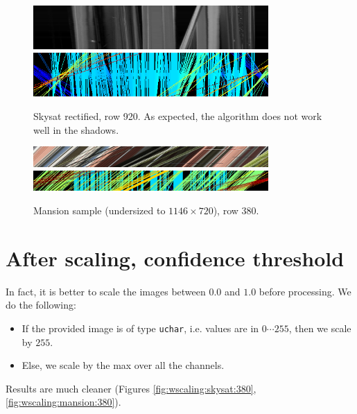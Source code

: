 \documentclass{article}
\def\epiWidth{0.8}
\theoremstyle{definition}
\begin{document}
\begin{figure}[ht]
  \centering
  \includegraphics[width=\epiWidth\textwidth]{images/1520205074004_epi.png}\\
  \includegraphics[width=\epiWidth\textwidth]{images/1520205074004_epi_colored.png}
  \caption{Skysat rectified, row 920. As expected, the algorithm does not work well in the shadows.}
\end{figure}


\begin{figure}[ht]
  \centering
  \includegraphics[width=\epiWidth\textwidth]{images/1520202945623_epi.png}\\
  \includegraphics[width=\epiWidth\textwidth]{images/1520202945623_epi_colored.png}
  \caption{Mansion sample (undersized to $1146\times 720$), row 380.}
\end{figure}


\clearpage
\section{After scaling, confidence threshold}


In fact, it is better to scale the images between $0.0$ and $1.0$ before processing. We do the following:
\begin{itemize}
 \item If the provided image is of type \verb#uchar#, i.e. values are in $0 \cdots 255$, then we scale by $255$.
 \item Else, we scale by the max over all the channels.
\end{itemize}
Results are much cleaner (Figures \ref{fig:wscaling:skysat:380}, \ref{fig:wscaling:mansion:380}).
\end{document}

